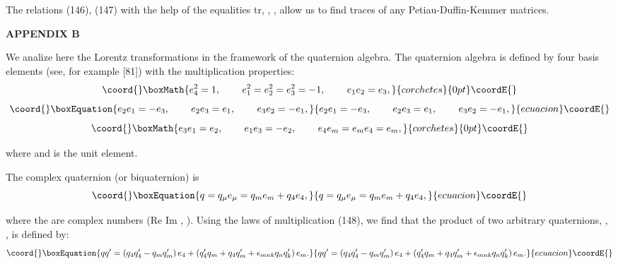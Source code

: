 \documentclass[a4paper,12pt]{article}
\begin{document}
The relations (146), (147) with the help of the equalities
tr\coordHE{}, \myHighlight{$\delta
_{[\mu \nu ][\rho \sigma ]}=\delta _{\mu \rho }\delta _{\nu \sigma
}-\delta _{\mu \sigma }\delta _{\nu \rho }$}\coordHE{}, \coordHE{}, \coordHE{} allow us
to find traces of any Petiau-Duffin-Kemmer matrices.

\begin{center}
{\bf APPENDIX B}
\end{center}

We analize here the Lorentz transformations in the framework of
the quaternion algebra. The quaternion algebra is defined by four
basis elements \coordHE{} (see, for example [81]) with
the multiplication properties:
\[\coord{}\boxMath{
e_4^2=1,\hspace{0.3in}e_1^2=e_2^2=e_3^2=-1,\hspace{0.3in}e_1e_2=e_3,
}{corchetes}{0pt}\coordE{}\]
\begin{equation}\coord{}\boxEquation{
e_2e_1=-e_3,\hspace{0.3in}e_2e_3=e_1,\hspace{0.3in}e_3e_2=-e_1,
\label{148}
}{
e_2e_1=-e_3,\hspace{0.3in}e_2e_3=e_1,\hspace{0.3in}e_3e_2=-e_1,
}{ecuacion}\coordE{}\end{equation}
\[\coord{}\boxMath{
e_3e_1=e_2,\hspace{0.3in}e_1e_3=-e_2,\hspace{0.3in}e_4e_m=e_me_4=e_m,
}{corchetes}{0pt}\coordE{}\]

where \coordHE{}  \coordHE{}  \coordHE{} and \coordHE{} is the unit element.

The complex quaternion (or biquaternion) \coordHE{} is
\begin{equation}\coord{}\boxEquation{
q=q_\mu e_\mu =q_me_m+q_4e_4,  \label{149}
}{
q=q_\mu e_\mu =q_me_m+q_4e_4,  }{ecuacion}\coordE{}\end{equation}

where the \coordHE{} are complex numbers (\coordHE{}Re \coordHE{}Im
\coordHE{}, \coordHE{}). Using the laws of multiplication (148), we
find that the product of two arbitrary quaternions, \coordHE{},
\coordHE{}, is defined by:
\begin{equation}\coord{}\boxEquation{
qq^{\prime }=\left( q_4q_4^{\prime }-q_mq_m^{\prime }\right)
e_4+\left( q_4^{\prime }q_m+q_4q_m^{\prime }+\epsilon
_{mnk}q_nq_k^{\prime }\right) e_m. \label{150}
}{
qq^{\prime }=\left( q_4q_4^{\prime }-q_mq_m^{\prime }\right)
e_4+\left( q_4^{\prime }q_m+q_4q_m^{\prime }+\epsilon
_{mnk}q_nq_k^{\prime }\right) e_m. }{ecuacion}\coordE{}\end{equation}
\end{document}
